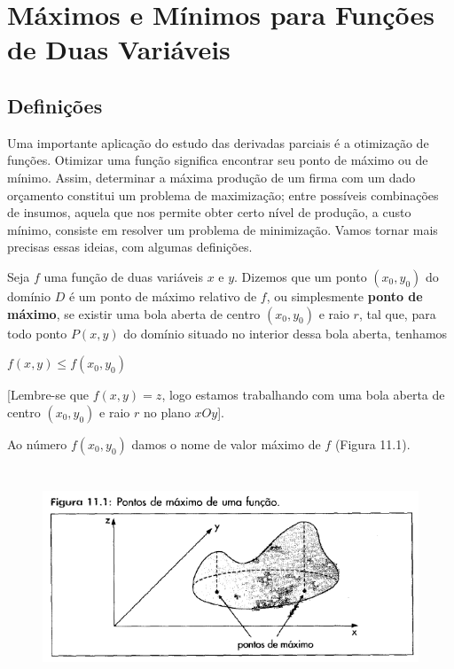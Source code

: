 \section{Máximos e Mínimos para Funções de Duas Variáveis}

		\subsection{Definições \cite{morettin}}

		Uma importante aplicação do estudo das derivadas parciais é a otimização de funções. Otimizar uma função significa encontrar seu ponto de máximo ou de mínimo. Assim, determinar a máxima produção de um firma com um dado orçamento constitui um problema de maximização; entre possíveis combinações de insumos, aquela que nos permite obter certo nível de produção, a custo mínimo, consiste em resolver um problema de minimização. Vamos tornar mais precisas essas ideias, com algumas definições.

		Seja $f$ uma função de duas variáveis $x$ e $y$. Dizemos que um ponto $(x_{0}, y_{0})$ do domínio $D$ é um ponto de máximo relativo de $f$, ou simplesmente \textbf{ponto de máximo}, se existir uma bola aberta de centro $(x_{0}, y_{0})$ e raio $r$, tal que, para todo ponto $P(x, y)$ do domínio situado no interior dessa bola aberta, tenhamos

		\medskip

		$f(x, y) \leq f(x_{0}, y_{0})$

		\medskip

		[Lembre-se que $f(x, y) = z$, logo estamos trabalhando com uma bola aberta de centro $(x_{0}, y_{0})$ e raio $r$ no plano $xOy$].

		\medskip

		Ao número $f(x_{0}, y_{0})$ damos o nome de valor máximo de $f$ (Figura 11.1).

		\begin{figure}[H]
				\includegraphics[height=6.5cm]{images/morettin_figura-11-1}
		\end{figure}

